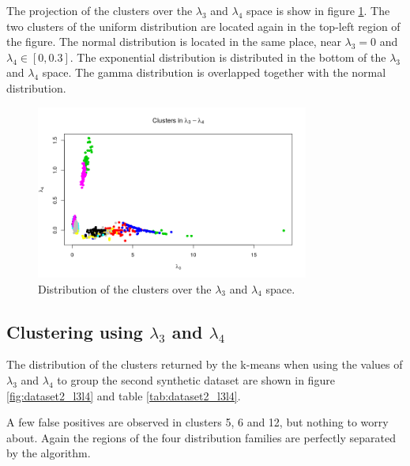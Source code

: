 The projection of the clusters over the $\lambda_{3}$ and $\lambda_{4}$ space is show in figure \ref{fig:dataset2_l2l3l4_l3_l4}. The two clusters of the uniform distribution are located again in the top-left region of the figure. The normal distribution is located in the same place, near $\lambda_{3} = 0$ and $\lambda_{4} \in [0, 0.3]$. The exponential distribution is distributed in the bottom of the $\lambda_{3}$ and $\lambda_{4}$ space. The gamma distribution is overlapped together with the normal distribution.

\begin{figure}[H]
    \centering
    \includegraphics[width=0.8\textwidth]{img/gld_clustering/Dataset2/nuevo/l3_l4.png}
    \caption{Distribution of the clusters over the $\lambda_{3}$ and $\lambda_{4}$ space.}
    \label{fig:dataset2_l2l3l4_l3_l4}
\end{figure}


\subsection{Clustering using $\lambda_{3}$ and $\lambda_{4}$}\label{syntheticI_l34}

The distribution of the clusters returned by the k-means when using the values of $\lambda_{3}$ and $\lambda_{4}$ to group the second synthetic dataset are shown in figure \ref{fig:dataset2_l3l4} and table \ref{tab:dataset2_l3l4}.
 
A few false positives are observed in clusters 5, 6 and 12, but nothing to worry about. Again the regions of the four distribution families are perfectly separated by the algorithm. 
 
